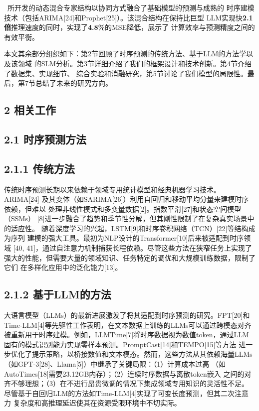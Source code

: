 \documentclass[
  10
]{article}
\begin{document}
\textbullet\ 所开发的动态混合专家结构以协同方式融合了基础模型的预测与成熟的
时序建模技术（包括ARIMA{[}24{]}和Prophet{[}25{]}）。该混合结构在保持比巨型
LLM实现快\textbf{2.1倍}推理速度的同时，实现了\textbf{4.8\%}的MSE降低，展示了
计算效率与预测精度之间的有效平衡。

本文其余部分组织如下：第2节回顾了时序预测的传统方法、基于LLM的方法学以及该领域
的SLM分析。第3节详细介绍了我们的框架设计和技术创新。第4节介绍了数据集、实现细节、
综合实验和消融研究，第5节讨论了我们模型的局限性。最后，第7节总结了未来的研究方向。

\subsection{2 相关工作}\label{related-work}

\subsection{2.1 时序预测方法}\label{time-series-forecasting-methods}

\subsection{2.1.1 传统方法}\label{traditional-methods}

传统时序预测长期以来依赖于领域专用统计模型和经典机器学习技术。ARIMA{[}24{]}
及其变体（如SARIMA{[}26{]}）利用自回归和移动平均分量来建模时序依赖，但难以
处理非线性模式和多变量数据{[}2{]}。指数平滑{[}27{]}和状态空间模型（SSMs）
{[}8{]}进一步融合了趋势和季节性分解，但其刚性限制了在复杂真实场景中的适应性。
随着深度学习的兴起，LSTM{[}9{]}和时序卷积网络（TCN）{[}22{]}等结构成为序列
建模的强大工具。最初为NLP设计的Transformer{[}10{]}后来被适配到时序领域
{[}40, 41{]}，通过自注意力机制捕获长程依赖。尽管这些方法在狭窄任务上实现了
强大的性能，但需要大量的领域知识、任务特定的调优和大规模训练数据，限制了它们
在多样化应用中的泛化能力{[}13{]}。

\subsection{2.1.2 基于LLM的方法}\label{llm-based-methods}

大语言模型（LLMs）的最新进展激发了将其适配到时序预测的研究。FPT{[}20{]}和
Time-LLM{[}4{]}等先驱性工作表明，在文本数据上训练的LLMs可以通过跨模态对齐
被重新用于时序建模。例如，LLMTime{[}7{]}将时序数据视为数值token，通过LLM
固有的模式识别能力实现零样本预测。PromptCast{[}14{]}和TEMPO{[}15{]}等方法
进一步优化了提示策略，以桥接数值和文本模态。然而，这些方法从其依赖海量LLMs
（如GPT-3{[}28{]}、Llama{[}5{]}）中继承了关键局限：（1）计算成本过高
（如AutoTimes{[}18{]}需要23.12GB内存）；（2）连续时序数据与离散token嵌入
之间的对齐不够理想；（3）在不进行昂贵微调的情况下集成领域专用知识的灵活性不足。
尽管基于自回归LLM的方法如Time-LLM{[}4{]}实现了可变长度预测，但其二次注意力
复杂度和高推理延迟使其在资源受限环境中不切实际。
\end{document}
